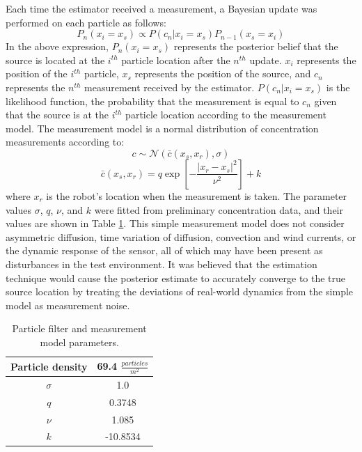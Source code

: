 \documentclass[submit, 12pt]{aiaa-pretty-modified}
\begin{document}
Each time the estimator received a
measurement, a Bayesian update was performed on each particle
as follows: 
\[P_n(x_i = x_s) \propto P(c_n | x_i = x_s) P_{n-1}(x_s = x_i)\]
In the above expression, $P_n(x_i = x_s)$ represents the posterior belief that the source is located at the
$i^{th}$ particle location after the $n^{th}$ update.  $x_i$
represents the position of the $i^{th}$ particle, $x_s$ represents the
position of the source, and $c_n$ represents
the $n^{th}$ measurement received by the estimator. $P(c_n | x_i =
x_s)$ is the likelihood function, the probability that the measurement
is equal to $c_n$ given that the source is at the $i^{th}$ particle location according to
the measurement model. The measurement model is a normal
distribution of concentration
measurements according to: 
\[c \sim \mathcal{N}\left(\bar{c}(x_s,x_r), \sigma \right)\]
\[\bar{c}(x_s,x_r) = q \exp{\left[-\frac{|x_r - x_s|^2}{\nu^2}\right]} + k\]
where $x_r$ is the robot's location when the measurement is taken. The parameter
values $\sigma$, $q$, $\nu$, and $k$ were fitted from preliminary
concentration data, and their values are shown in Table
\ref{tab:estimator-parameters}.  This simple measurement model does
not consider asymmetric
diffusion, time variation of diffusion, convection and wind currents, or the dynamic response of the
sensor, all of which may have been present as disturbances in the test environment. It was believed that the estimation technique would
cause the posterior estimate to accurately converge to the true source location by
treating the deviations of real-world
dynamics from the simple model as measurement noise.

\begin{table}
\caption[Estimator parameters]{Particle filter and measurement model parameters.}
\begin{center}
\begin{tabular}{|c|c|}
\hline
Particle density & 69.4 $\frac{particles}{m^2}$ \\ \hline
$\sigma$ & 1.0 \\ \hline
$q$ & 0.3748 \\ \hline
$\nu$ & 1.085  \\ \hline
$k$ & -10.8534  \\ \hline
\end{tabular}
\end{center}
\label{tab:estimator-parameters}
\end{table}
\end{document}
